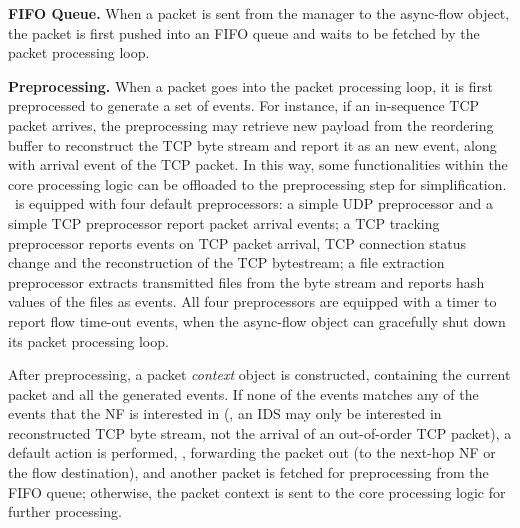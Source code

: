 \vspace{1mm}
\noindent\textbf{FIFO Queue.} When a packet is sent from the manager to the async-flow object, the packet is first pushed into an FIFO queue and waits to be fetched by the packet processing loop. %

\vspace{1mm}
\noindent\textbf{Preprocessing.} When a packet goes into the packet processing loop,  it is first preprocessed to generate a set of events. %
 For instance, if an in-sequence TCP packet arrives, the preprocessing may retrieve new payload from the reordering buffer to reconstruct the TCP byte stream and report it as an new event, along with arrival event of the TCP packet. In this way, some functionalities within the core processing logic can be offloaded to the preprocessing step for simplification. \netstar~is equipped with four default preprocessors: a simple UDP preprocessor and a simple TCP preprocessor report packet arrival events; a TCP tracking preprocessor reports events on TCP packet arrival, TCP connection status change and the reconstruction of the TCP bytestream; a file extraction preprocessor extracts transmitted files from the byte stream and reports hash values of the files as events. All four preprocessors are equipped with a timer to report flow time-out events, when the async-flow object can gracefully shut down its packet processing loop.


After preprocessing, a packet {\em context} object is constructed, containing the current packet and all the generated events. If none of the events matches any of the events that the NF is interested in (\eg, an IDS may only be interested in reconstructed TCP byte stream, not the arrival of an out-of-order TCP packet), a default action is performed, \ie, forwarding the packet out (to the next-hop NF or the flow destination), and another packet is fetched for preprocessing from the FIFO queue; otherwise, the packet context is sent to the core processing logic for further processing.



